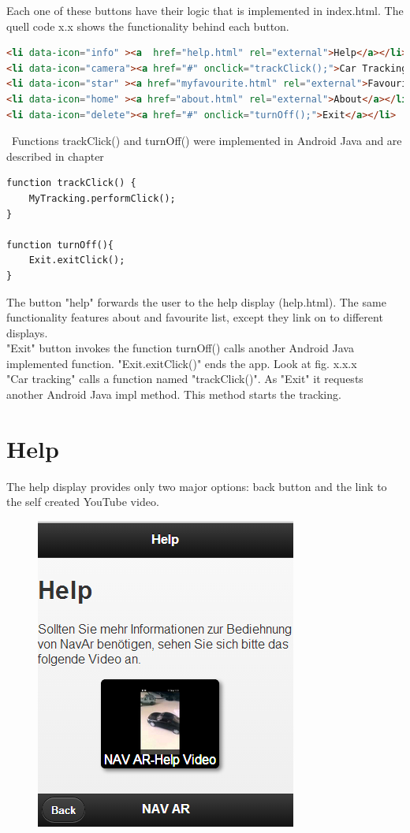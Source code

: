 Each one of these buttons have their logic that is implemented in index.html. The quell code x.x  shows the functionality behind each button.
\\

\begin{lstlisting}[language=html, caption= 
start menu source code,captionpos=b]
<li data-icon="info" ><a  href="help.html" rel="external">Help</a></li>
<li data-icon="camera"><a href="#" onclick="trackClick();">Car Tracking</a></li>
<li data-icon="star" ><a href="myfavourite.html" rel="external">Favourite List</a></li>
<li data-icon="home" ><a href="about.html" rel="external">About</a></li>
<li data-icon="delete"><a href="#" onclick="turnOff();">Exit</a></li>
\end{lstlisting}

\
Functions trackClick() and turnOff() were implemented in Android Java and are described in chapter 
\
\
\begin{lstlisting}[language=html, caption= 
JS start menu methods,captionpos=b]
function trackClick() {
    MyTracking.performClick();
}

function turnOff(){
	Exit.exitClick();
}
\end{lstlisting}

The button "help" forwards the user  to the help display (help.html). The same functionality features about and favourite list, except they link on to different displays. 
\\

"Exit" button invokes the function turnOff() calls another Android Java implemented function. "Exit.exitClick()" ends the app. Look at fig. x.x.x
\\

"Car tracking" calls a function named "trackClick()". As "Exit" it requests another Android Java impl method. This method starts the tracking.
\\

\section{Help}

The help display provides only two major options: back button and the link to the self created YouTube video. 


\begin{figure}[b]
\centering
\includegraphics[width=0.5\linewidth]{graphics/chapter4/2}
\caption{}
\label{fig:2}
\end{figure}
\newpage

